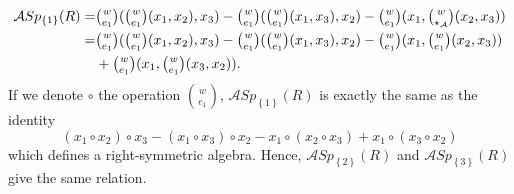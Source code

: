 \documentclass[11pt, twoside]{article}
\begin{document}
\begin{ex}
\begin{enumerate}
\begin{align*}
    \mathcal{A}Sp_{\left\{1\right\}}(R)=&\tbinom{w}{e_1}(\tbinom{w}{e_1}(x_1,x_2),x_3)- \tbinom{w}{e_1}(\tbinom{w}{e_1}(x_1,x_3),x_2)- \tbinom{w}{e_1}(x_1,\tbinom{w}{\star_{\mathcal{A}}}(x_2,x_3)) \\ =& \tbinom{w}{e_1}(\tbinom{w}{e_1}(x_1,x_2),x_3)- \tbinom{w}{e_1}(\tbinom{w}{e_1}(x_1,x_3),x_2)- \tbinom{w}{e_1}(x_1,\tbinom{w}{e_1}(x_2,x_3)) \\ &+\tbinom{w}{e_1}(x_1,\tbinom{w}{e_1}(x_3,x_2)) . 
\end{align*} If we denote $\circ $ the operation $\binom{w}{e_1} $, $\mathcal{A}Sp_{\left\{1\right\}}(R) $ is exactly the same as the identity $$(x_1\circ x_2)\circ x_3 - (x_1\circ x_3)\circ x_2 - x_1\circ(x_2\circ x_3) + x_1\circ (x_3\circ x_2) $$ which defines a right-symmetric algebra. Hence, $\mathcal{A}Sp_{\left\{2\right\}}(R) $ and $\mathcal{A}Sp_{\left\{3\right\}}(R) $ give the same relation. 
    \end{enumerate}
\end{ex}
\end{document}
